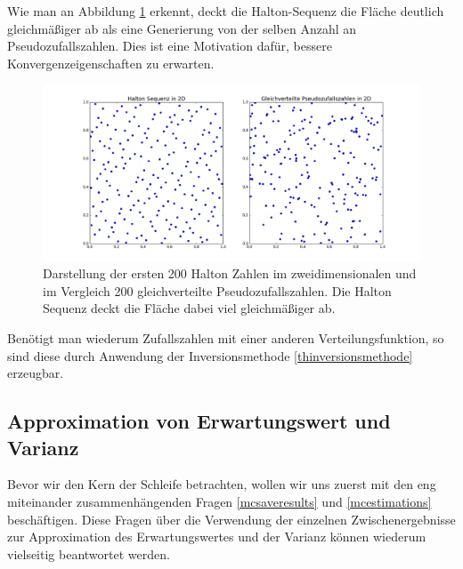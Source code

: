 Wie man an Abbildung \ref{fig:halton_numbers} erkennt, deckt die Halton-Sequenz die Fläche deutlich gleichmäßiger ab als eine Generierung von der selben Anzahl an Pseudozufallszahlen. Dies ist eine Motivation dafür, bessere Konvergenzeigenschaften zu erwarten.
\begin{figure}
\includegraphics[width=\textwidth]{Figures/halton_numbers.png}
\caption{Darstellung der ersten 200 Halton Zahlen im zweidimensionalen und im Vergleich 200 gleichverteilte Pseudozufallszahlen. Die Halton Sequenz deckt die Fläche dabei viel gleichmäßiger ab.}
\label{fig:halton_numbers}
\end{figure}
Benötigt man wiederum Zufallszahlen mit einer anderen Verteilungsfunktion, so sind diese durch Anwendung der Inversionsmethode \ref{thinversionsmethode} erzeugbar.

\subsection{Approximation von Erwartungswert und Varianz}
Bevor wir den Kern der Schleife betrachten, wollen wir uns zuerst mit den eng miteinander zusammenhängenden Fragen \ref{mcsaveresults} und \ref{mcestimations} beschäftigen. Diese Fragen über die Verwendung der einzelnen Zwischenergebnisse zur Approximation des Erwartungswertes und der Varianz können wiederum vielseitig beantwortet werden.
